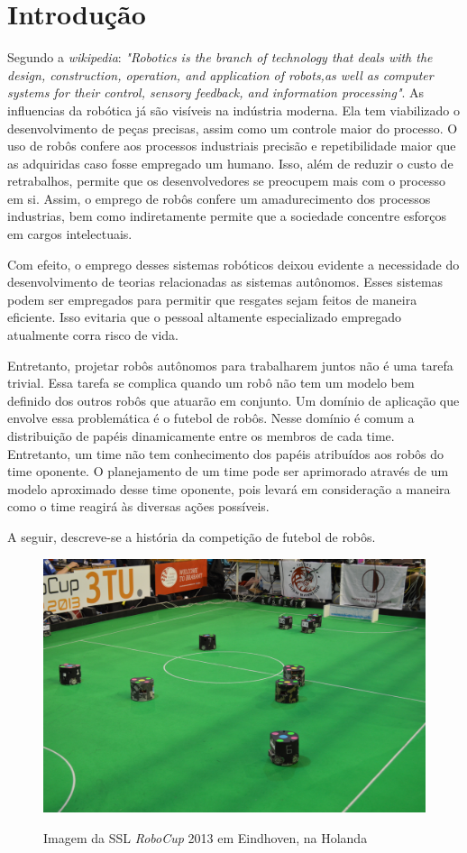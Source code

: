 \chapter{Introdução}


Segundo a \textit{wikipedia}:
\textit{"Robotics is the branch of technology that deals with the design, construction,
operation, and application of robots,as well as computer systems for their control,
sensory feedback, and information processing"}. As influencias da robótica já
são visíveis na indústria moderna. Ela tem viabilizado o desenvolvimento de peças
precisas, assim como um controle maior do processo. O uso de robôs confere aos
processos industriais precisão e repetibilidade maior que as adquiridas caso
fosse empregado um humano. Isso, além de reduzir o custo de retrabalhos, permite
que os desenvolvedores se preocupem mais com o processo em si. Assim, o emprego
de robôs confere um amadurecimento dos processos industrias, bem como indiretamente
permite que a sociedade concentre esforços em cargos intelectuais.

Com efeito, o emprego desses sistemas robóticos deixou evidente a necessidade do
desenvolvimento de teorias relacionadas as sistemas autônomos. Esses sistemas podem
ser empregados para permitir que resgates sejam feitos de maneira eficiente. Isso
evitaria que o pessoal altamente especializado empregado atualmente corra risco de vida.

Entretanto, projetar robôs autônomos para trabalharem juntos não é uma tarefa trivial. Essa
tarefa se complica quando um robô não tem um modelo bem definido dos outros robôs que atuarão em
conjunto. Um domínio de aplicação que envolve essa problemática é o futebol de robôs.
Nesse domínio é comum a distribuição de papéis dinamicamente entre os membros de cada
time. Entretanto, um time não tem conhecimento dos papéis atribuídos aos robôs
do time oponente. O planejamento de um time pode ser aprimorado através de um modelo
aproximado desse time oponente, pois levará em consideração a maneira como o
time reagirá às diversas ações possíveis.

A seguir, descreve-se a história da competição de futebol de robôs.

\begin{figure}
  \includegraphics[width = \linewidth]{figuras/robocup2013}\label{robocup2013}
  \caption{Imagem da SSL \textit{RoboCup} 2013 em Eindhoven, na Holanda}
\end{figure}


